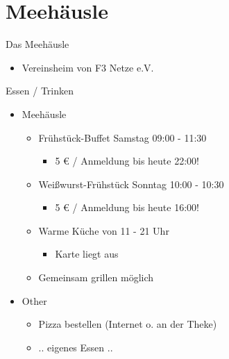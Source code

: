 \section{Meehäusle}

\begin{frame}{Das Meehäusle}
    \begin{itemize}
        \item Vereinsheim von F3 Netze e.V.
    \end{itemize}
\end{frame}

\begin{frame}{Essen / Trinken}
    \begin{itemize}
        \item Meehäusle
        \begin{itemize}
            \item Frühstück-Buffet Samstag 09:00 - 11:30
            \begin{itemize}
                \item 5 € / Anmeldung bis heute 22:00!
            \end{itemize}
            \item Weißwurst-Frühstück Sonntag 10:00 - 10:30
            \begin{itemize}
                \item 5 € / Anmeldung bis heute 16:00!
            \end{itemize}
            \item Warme Küche von 11 - 21 Uhr
            \begin{itemize}
                \item Karte liegt aus
            \end{itemize}
            \item Gemeinsam grillen möglich
        \end{itemize}
        \item Other
        \begin{itemize}
            \item Pizza bestellen (Internet o. an der Theke)
            \item .. eigenes Essen ..
        \end{itemize}
    \end{itemize}
\end{frame}

